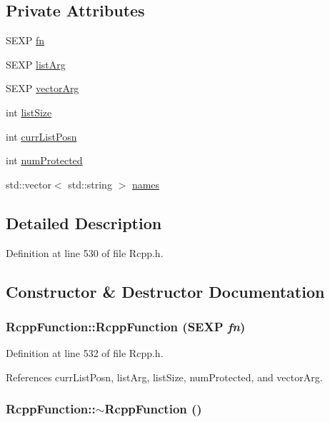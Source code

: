 \subsection*{Private Attributes}
\begin{DoxyCompactItemize}
\item 
SEXP \hyperlink{classRcppFunction_aa6b5966224b8b7d158be6cdfc3612063}{fn}
\item 
SEXP \hyperlink{classRcppFunction_a3b8a2c8441c9791f9fe5bd5273bbceec}{listArg}
\item 
SEXP \hyperlink{classRcppFunction_a0492c128c0f72cda44e679265b36b50e}{vectorArg}
\item 
int \hyperlink{classRcppFunction_ac3a42478ffd123f430ba3e09099db6f8}{listSize}
\item 
int \hyperlink{classRcppFunction_ace513a92e96b36883b709b5352ea5663}{currListPosn}
\item 
int \hyperlink{classRcppFunction_adc777e7d1628ccc4f531a8375f30f385}{numProtected}
\item 
std::vector$<$ std::string $>$ \hyperlink{classRcppFunction_abf9e86df5e1a290a5f321e6051f0d2b2}{names}
\end{DoxyCompactItemize}


\subsection{Detailed Description}


Definition at line 530 of file Rcpp.h.

\subsection{Constructor \& Destructor Documentation}
\hypertarget{classRcppFunction_a6fc6fca8d052170d86240c784f54261a}{
\subsubsection[{RcppFunction}]{\setlength{\rightskip}{0pt plus 5cm}RcppFunction::RcppFunction (SEXP {\em fn})}}
\label{classRcppFunction_a6fc6fca8d052170d86240c784f54261a}


Definition at line 532 of file Rcpp.h.

References currListPosn, listArg, listSize, numProtected, and vectorArg.\hypertarget{classRcppFunction_ae155cf5dd33cb110e9a89a59c7bff6e9}{
\subsubsection[{$\sim$RcppFunction}]{\setlength{\rightskip}{0pt plus 5cm}RcppFunction::$\sim$RcppFunction ()}}
\label{classRcppFunction_ae155cf5dd33cb110e9a89a59c7bff6e9}


